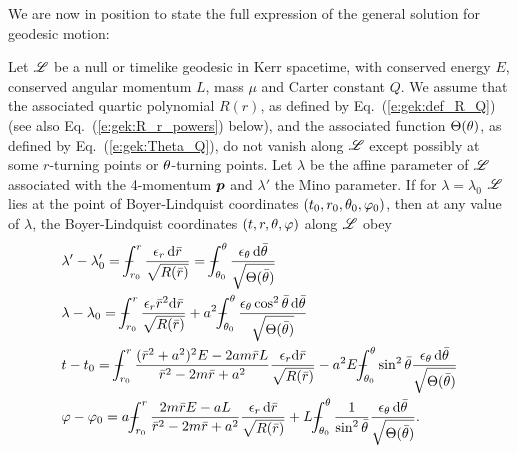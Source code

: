 We are now in position to state the full expression of the general
solution for geodesic motion:
\begin{prop}
Let $\mathscr{L}$ be a null or timelike geodesic in Kerr spacetime,
with conserved energy $E$, conserved angular momentum $L$, mass $\mu$ and
Carter constant $Q$. We assume that the associated quartic polynomial $R(r)$,
as defined by Eq.~(\ref{e:gek:def_R_Q}) (see also Eq.~(\ref{e:gek:R_r_powers}) below),
and the associated function $\Theta(\theta)$, as defined by Eq.~(\ref{e:gek:Theta_Q}),
do not vanish along $\mathscr{L}$ except possibly at some $r$-turning points or
$\theta$-turning points.
Let $\lambda$ be the affine parameter of $\mathscr{L}$
associated with the 4-momentum $\bm{p}$ and $\lambda'$ the
Mino parameter. If for $\lambda=\lambda_0$
$\mathscr{L}$ lies at the point of Boyer-Lindquist coordinates $(t_0,r_0,\theta_0,\varphi_0)$,
then at any value of $\lambda$, the Boyer-Lindquist coordinates $(t,r,\theta,\varphi)$ along $\mathscr{L}$
obey
\begin{subequations}
\label{e:gek:integrated_eqs}
\begin{align}
 & \lambda' - \lambda'_0 = \dashint_{r_0}^r \frac{\eps_r \, \D \bar{r}}{\sqrt{R(\bar{r})}}
   = \dashint_{\th_0}^\th \frac{\eps_\th \, \D \bar{\th}}{\sqrt{\Theta(\bar{\th})}}
    \label{e:gek:integr_Mino}\\
 & \lambda - \lambda_0 = \dashint_{r_0}^r \frac{\eps_r \bar{r}^2 \D \bar{r}}{\sqrt{R(\bar{r})}}
    + a^2 \dashint_{\th_0}^\th \frac{\eps_\th \cos^2\bar{\th} \, \D \bar{\th}}{\sqrt{\Theta(\bar{\th})}}
    \label{e:gek:integr_lambda} \\
 & t - t_0 = \dashint_{r_0}^r  \frac{(\bar{r}^2 + a^2)^2 E - 2 a m \bar{r} L}{\bar{r}^2 - 2m\bar{r} + a^2} \frac{\eps_r\D \bar{r}}{\sqrt{R(\bar{r})}}
 - a^2 E \dashint_{\th_0}^\th  \sin^2\bar{\th}  \frac{\eps_\th \, \D \bar{\th}}{\sqrt{\Theta(\bar{\th})}} \label{e:gek:integr_t} \\
 & \ph - \ph_0 = a \dashint_{r_0}^r  \frac{2m\bar{r} E - a L}{\bar{r}^2 - 2m \bar{r} + a^2}
    \frac{\eps_r \, \D \bar{r}}{\sqrt{R(\bar{r})}}
    + L \dashint_{\th_0}^\th \frac{1}{\sin^2\bar{\th}} \frac{\eps_\th \, \D \bar{\th}}{\sqrt{\Theta(\bar{\th})}} . \label{e:gek:integr_ph}
\end{align}
\end{subequations}
\end{prop}
